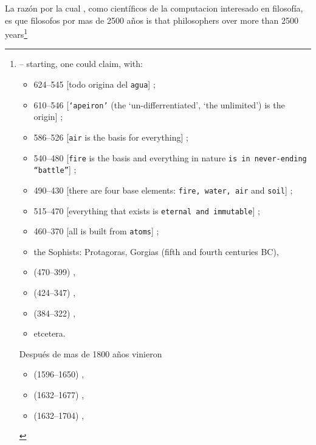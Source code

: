 \mnewfoil
      
\begynd
\pind La razón por la cual , como científicos de la computacion  interesado en filosofía,
\begynd
\pind es que filosofos por mas de 2500 años is that philosophers over more than 2500
      years{\footnote{\LLLL -- \label{citations-1}
      starting, one could claim, with:\scriptsize\footnotesize
\begin{multicols}{2}
\begin{itemize}
\item {} 624--545 [todo origina del 
      {\texttt{agua}}] \cite{Thales:Dines};
\item {} 610--546 [{\texttt{`apeiron'}} (the
      `un\--dif\-fer\-ren\-ti\-a\-ted', `the unlimited') is the
      origin] \cite{Anaximander:Dines};
\item {} 586--526 [{\texttt{air}} is the basis for
      everything] \cite{Anaximenes:Dines};
\item  {} 540--480 [\texttt{fire} is the
      basis and everything in nature {\texttt{is in never-ending
          ``battle''}}]  \cite{Heraklit:Dines};
\item {} 490--430 [there are four base elements:
      {\texttt{fire, water, air}} and {\texttt{soil}}] \cite{Empedokles:Dines};
\item {} 515--470 [everything that exists is \texttt{eternal and
          immutable}] \cite{Parminedes:Dines};
\item {} 460--370 [all is built from {\texttt{atoms}}] \cite{Demokrit:Dines};
\item the Sophists: Protagoras, Gorgias (fifth and fourth centuries BC),
\item {} (470--399) \cite{Socrates:Dines},
\item {} (424--347) \cite{Plato:Dines},
\item {} (384--322) \cite{Aristotle:Dines-x},
\item etcetera.
\end{itemize}
\noindent
Después de mas de 1800 años vinieron 
\begin{itemize}
\item {} (1596--1650) \cite{Descartes:Dines},
\item {} (1632--1677) \cite{Spinoza:Dines},
\item {} (1632--1704) \cite{Locke:Dines},

\end{itemize}
\end{multicols}}}
